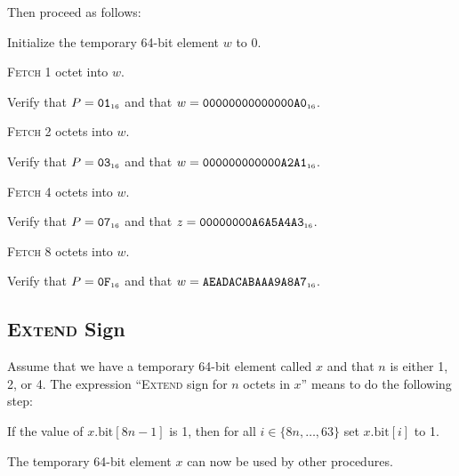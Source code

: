 \documentclass[a4paper,12pt]{article}
\newcommand{\num}[1]{\texttt{#1}}
\newcommand{\hex}[1]{\num{#1}_{\textup{\tiny 16}}}
\newcommand{\PC}{P}
\newcommand{\bitno}[2]{#1.\mathrm{bit}[#2]}
\newcommand{\range}[2]{\{#1,\ldots,#2\}}
\newcommand{\proc}[1]{\textsc{#1}}
\begin{document}
Then proceed as follows:
\begin{stepnumbers}
\item Initialize the temporary 64-bit element $w$ to 0.
\item \proc{Fetch} 1 octet into $w$.
\item Verify that $\PC = \hex{01}$ and that $w = \hex{00000000000000A0}$.
\item \proc{Fetch} 2 octets into $w$.
\item Verify that $\PC = \hex{03}$ and that $w = \hex{000000000000A2A1}$.
\item \proc{Fetch} 4 octets into $w$.
\item Verify that $\PC = \hex{07}$ and that $z = \hex{00000000A6A5A4A3}$.
\item \proc{Fetch} 8 octets into $w$.
\item Verify that $\PC = \hex{0F}$ and that $w = \hex{AEADACABAAA9A8A7}$.
\end{stepnumbers}

\subsection{\proc{Extend} Sign}

Assume that we have a temporary 64-bit element called $x$ and that $n$ is either 1, 2, or 4.
The expression ``\proc{Extend} sign for $n$ octets in $x$'' means to do the following step:
\begin{stepnumbers}
\item If the value of $\bitno{x}{8n-1}$ is 1, then for all $i \in \range{8n}{63}$ set $\bitno{x}{i}$ to 1.
\end{stepnumbers}
The temporary 64-bit element $x$ can now be used by other procedures.
\end{document}
